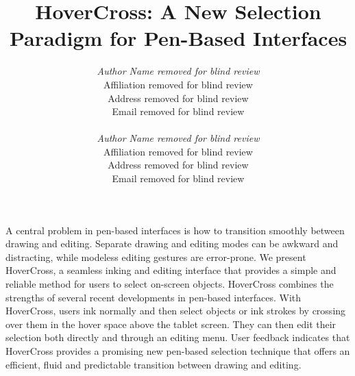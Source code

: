 \documentclass{article}
\begin{document}

\toappear{}



\title{HoverCross: A New Selection Paradigm for Pen-Based Interfaces}


\author{
\parbox[t]{9cm}{\centering
	     {\em Author Name removed for blind review}\\
	     Affiliation removed for blind review\\
         Address removed for blind review\\
	     Email removed for blind review\\}
\parbox[t]{9cm}{\centering
	     {\em Author Name removed for blind review}\\
	     Affiliation removed for blind review\\
	     Address removed for blind review\\
	     Email removed for blind review}
}

\maketitle

\abstract A central problem in pen-based interfaces is how to
transition smoothly between drawing and editing.  Separate drawing and
editing modes can be awkward and distracting, while modeless editing
gestures are error-prone.  We present HoverCross, a seamless inking and
editing interface that provides a simple and reliable method for users
to select on-screen objects.  HoverCross
combines the strengths of several recent developments in pen-based
interfaces.  With HoverCross, users ink normally and then select
objects or ink strokes by crossing over them in the hover space above
the tablet screen.  They can then edit their selection both directly and
through an editing menu.  User feedback indicates
that HoverCross provides a promising new pen-based selection technique 
that offers an efficient, fluid and predictable transition between drawing and editing.
\end{document}
